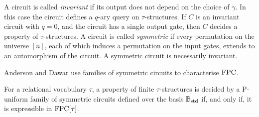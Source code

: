 \documentclass[../paper.tex]{subfiles}
\begin{document}
A circuit is called \emph{invariant} if its output does not depend on the choice
of $\gamma$. In this case the circuit defines a $q$-ary query on
$\tau$-structures. If $C$ is an invariant circuit with $q = 0$, and the circuit
has a single output gate, then $C$ decides a property of $\tau$-structures. A circuit
is called \emph{symmetric} if every permutation on the universe $[n]$, each of
which induces a permutation on the input gates, extends to an automorphism of
the circuit. A symmetric circuit is necessarily invariant.

Anderson and Dawar use families of symmetric circuits to characterise $\text{\upshape FPC}$.

\begin{thm}
  For a relational vocabulary $\tau$, a property of finite $\tau$-structures is
  decided by a P-uniform family of symmetric circuits defined over the basis
  $\mathbb{B}_{\text{std}}$ if, and only if, it is expressible in $\text{\upshape FPC}[\tau]$.
\end{thm}



\end{document}
